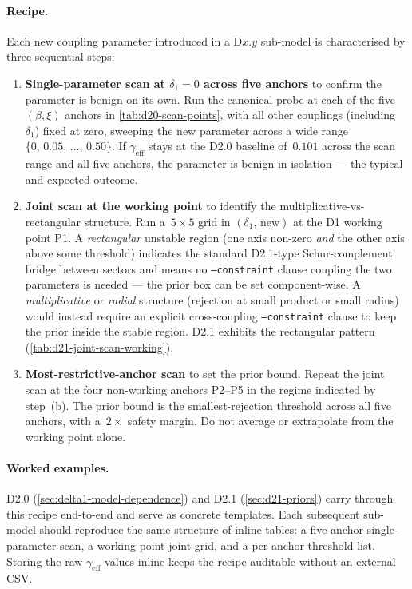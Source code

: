 \paragraph{Recipe.}
Each new coupling parameter introduced in a D$x.y$ sub-model is
characterised by three sequential steps:
\begin{enumerate}
  \item[(a)] \textbf{Single-parameter scan at $\delta_1 = 0$ across
    five anchors} to confirm the parameter is benign on its own.
    Run the canonical probe at each of the five
    $(\beta,\xi)$ anchors in \cref{tab:d20-scan-points}, with all
    other couplings (including~$\delta_1$) fixed at zero, sweeping
    the new parameter across a wide range
    $\{0,\,0.05,\,\ldots,\,0.50\}$.  If $\gamma_\mathrm{eff}$ stays
    at the D2.0 baseline of~$0.101$ across the scan range and all
    five anchors, the parameter is benign in isolation --- the
    typical and expected outcome.
  \item[(b)] \textbf{Joint scan at the working point} to identify
    the multiplicative-vs-rectangular structure.  Run a~$5\!\times\!5$
    grid in $(\delta_1,\,\text{new})$ at the D1 working point P1.
    A \emph{rectangular} unstable region (one axis non-zero
    \emph{and} the other axis above some threshold) indicates the
    standard D2.1-type Schur-complement bridge between sectors and
    means no \texttt{--constraint} clause coupling the two
    parameters is needed --- the prior box can be set
    component-wise.  A \emph{multiplicative} or \emph{radial}
    structure (rejection at small product or small radius) would
    instead require an explicit cross-coupling
    \texttt{--constraint} clause to keep the prior inside the
    stable region.  D2.1 exhibits the rectangular pattern
    (\cref{tab:d21-joint-scan-working}).
  \item[(c)] \textbf{Most-restrictive-anchor scan} to set the prior
    bound.  Repeat the joint scan at the four non-working anchors
    P2--P5 in the regime indicated by step~(b).  The prior bound
    is the smallest-rejection threshold across all five anchors,
    with a~$2\times$ safety margin.  Do not average or extrapolate
    from the working point alone.
\end{enumerate}

\paragraph{Worked examples.}
D2.0 (\cref{sec:delta1-model-dependence}) and D2.1
(\cref{sec:d21-priors}) carry through this recipe end-to-end and
serve as concrete templates.  Each subsequent sub-model should
reproduce the same structure of inline tables: a five-anchor
single-parameter scan, a working-point joint grid, and a per-anchor
threshold list.  Storing the raw $\gamma_\mathrm{eff}$ values inline
keeps the recipe auditable without an external CSV.

